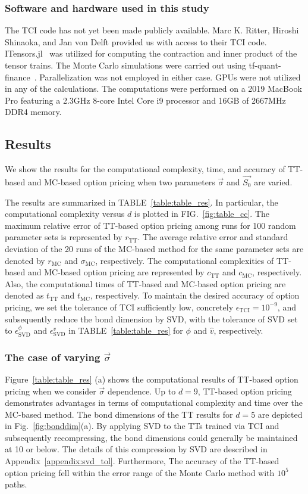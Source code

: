 \subsubsection*{Software and hardware used in this study}
The TCI code has not yet been made publicly available.
Marc K. Ritter, Hiroshi Shinaoka, and Jan von Delft provided us with access to their TCI code.
ITensors.jl~\cite{ITensor} was utilized for computing the contraction and inner product of the tensor trains. 
The Monte Carlo simulations were carried out using tf-quant-finance~\cite{monte}. Parallelization was not employed in either case. 
GPUs were not utilized in any of the calculations. 
The computations were performed on a 2019 MacBook Pro featuring a 2.3GHz 8-core Intel Core i9 processor and 16GB of 2667MHz DDR4 memory.

\subsection{Results}
We show the results for the computational complexity, time, and accuracy of TT-based and MC-based option pricing when two parameters $\vec{\sigma}$ and $\vec{S_0}$ are varied.

The results are summarized in TABLE~\ref{table:table_res}. 
In particular, the computational complexity versus $d$ is plotted in FIG.~\ref{fig:table_cc}.
The maximum relative error of TT-based option pricing among runs for 100 random parameter sets is represented by $r_{\mathrm{TT}}$. 
The average relative error and standard deviation of the 20 runs of the MC-based method for the same parameter sets are denoted by $r_{\mathrm{MC}}$ and $\sigma_{\text{MC}}$, respectively. 
The computational complexities of TT-based and MC-based option pricing are represented by $c_{\mathrm{TT}}$ and $c_{\mathrm{MC}}$, respectively.
Also, the computational times of TT-based and MC-based option pricing are denoted as $t_{\mathrm{TT}}$ and $t_{\mathrm{MC}}$, respectively.
To maintain the desired accuracy of option pricing, we set the tolerance of TCI sufficiently low, concretely $\epsilon_{\mathrm{TCI}} = 10^{-9}$, and subsequently reduce the bond dimension by SVD, with
the tolerance of SVD set to  $\epsilon_{\mathrm{SVD}}^\phi$ and $\epsilon_{\mathrm{SVD}}^v$ in TABLE~\ref{table:table_res} for $\phi$ and $\hat{v}$, respectively.


\subsubsection{The case of varying $\vec{\sigma}$}
Figure~\ref{table:table_res} (a) shows the computational results of TT-based option pricing when we consider $\vec{\sigma}$ dependence.
Up to \(d=9\), TT-based option pricing demonstrates advantages in terms of computational complexity and time over the MC-based method.
The bond dimensions of the TT results for $d=5$ are depicted in Fig.~\ref{fig:bonddim}(a). 
By applying SVD to the TTs trained via TCI and subsequently recompressing, the bond dimensions could generally be maintained at 10 or below. 
The details of this compression by SVD are described in Appendix~\ref{appendix:svd_tol}.
Furthermore, The accuracy of the TT-based option pricing fell within the error range of the Monte Carlo method with $10^5$ paths. 


